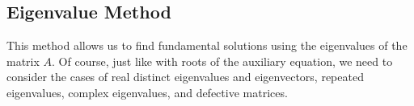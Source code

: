 \subsection{Eigenvalue Method}
\noindent
This method allows us to find fundamental solutions using the eigenvalues of the matrix $A$.
Of course, just like with roots of the auxiliary equation, we need to consider the cases of real distinct eigenvalues and eigenvectors, repeated eigenvalues, complex eigenvalues, and defective matrices. 






